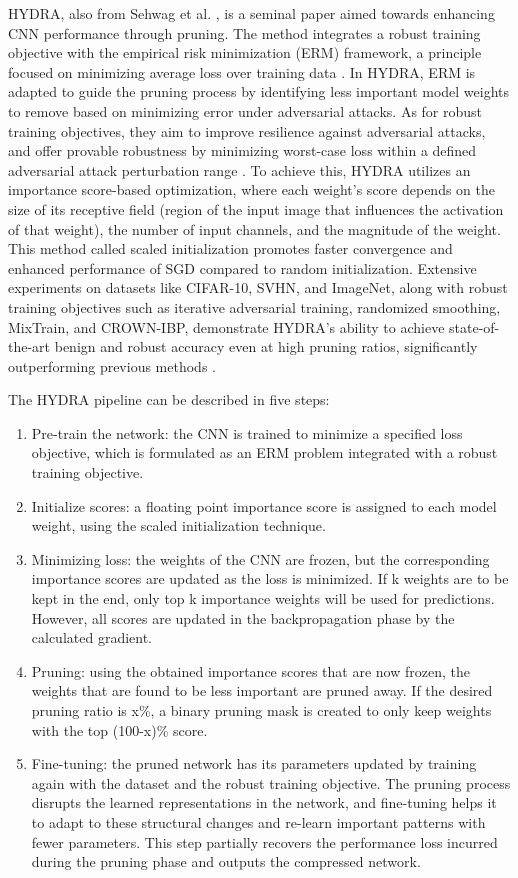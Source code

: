 \documentclass[journal,onecolumn,12pt]{IEEEtran}
\begin{document}
HYDRA, also from Sehwag et al. \cite{hydra}, is a seminal paper aimed towards enhancing CNN performance through pruning. The method integrates a robust training objective with the empirical risk minimization (ERM) framework, a principle focused on minimizing average loss over training data \cite{erm}. In HYDRA, ERM is adapted to guide the pruning process by identifying less important model weights to remove based on minimizing error under adversarial attacks. As for robust training objectives, they aim to improve resilience against adversarial attacks, and offer provable robustness by minimizing worst-case loss within a defined adversarial attack perturbation range \cite{mixtrain}. To achieve this, HYDRA utilizes an importance score-based optimization, where each weight's score depends on the size of its receptive field (region of the input image that influences the activation of that weight), the number of input channels, and the magnitude of the weight. This method called scaled initialization promotes faster convergence and enhanced performance of SGD compared to random initialization. Extensive experiments on datasets like CIFAR-10, SVHN, and ImageNet, along with robust training objectives such as iterative adversarial training, randomized smoothing, MixTrain, and CROWN-IBP, demonstrate HYDRA's ability to achieve state-of-the-art benign and robust accuracy even at high pruning ratios, significantly outperforming previous methods \cite{CIFAR, SVHN, imagenet, randsmooth, mixtrain, crownibp}.

The HYDRA pipeline can be described in five steps:
\begin{enumerate}
    \item Pre-train the network: the CNN is trained to minimize a specified loss objective, which is formulated as an ERM problem integrated with a robust training objective.
    \item Initialize scores: a floating point importance score is assigned to each model weight, using the scaled initialization technique. 
    \item Minimizing loss: the weights of the CNN are frozen, but the corresponding importance scores are updated as the loss is minimized. If k weights are to be kept in the end, only top k importance weights will be used for predictions. However, all scores are updated in the backpropagation phase by the calculated gradient.
    \item Pruning: using the obtained importance scores that are now frozen, the weights that are found to be less important are pruned away. If the desired pruning ratio is x\%, a binary pruning mask is created to only keep weights with the top (100-x)\% score. 
    \item Fine-tuning: the pruned network has its parameters updated by training again with the dataset and the robust training objective. The pruning process disrupts the learned representations in the network, and fine-tuning helps it to adapt to these structural changes and re-learn important patterns with fewer parameters. This step partially recovers the performance loss incurred during the pruning phase and outputs the compressed network. 
\end{enumerate}
\end{document}
